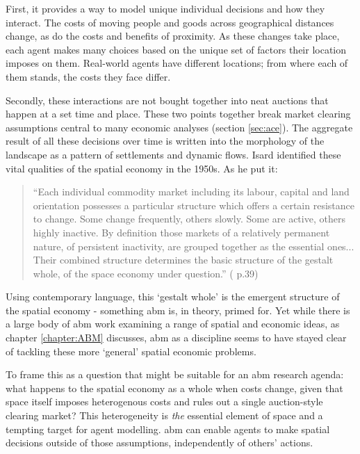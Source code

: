 First, it provides a way to model unique individual decisions and how they interact. The costs of moving people and goods across geographical distances change, as do the costs and benefits of proximity. As these changes take place, each agent makes many choices based on the unique set of factors their location imposes on them. Real-world agents have different locations; from where each of them stands, the costs they face differ. 

Secondly, these interactions are not bought together into neat auctions that happen at a set time and place. These two points together break market clearing assumptions central to many economic analyses (section \ref{sec:ace}). The aggregate result of all these decisions over time is written into the morphology of the landscape as a pattern of settlements and dynamic flows. Isard identified these vital qualities of the spatial economy in the 1950s. As he put it:

\begin{quote}
``Each individual commodity market including its labour, capital and land orientation possesses a particular structure which offers a certain resistance to change. Some change frequently, others slowly. Some are active, others highly inactive. By definition those markets of a relatively permanent nature, of persistent inactivity, are grouped together as the essential ones... Their combined structure determines the basic structure of the gestalt whole, of the space economy under question.'' (\citealt{isard_location_1956} p.39)
\end{quote}

Using contemporary language, this `gestalt whole' is the emergent structure of the spatial economy - something \gls{abm} is, in theory, primed for. Yet while there is a large body of \gls{abm} work examining a range of spatial and economic ideas, as chapter \ref{chapter:ABM} discusses, \gls{abm} as a discipline seems to have stayed clear of tackling these more `general' spatial economic problems. 

To frame this as a question that might be suitable for an \gls{abm} research agenda: what happens to the spatial economy as a whole when costs change, given that space itself imposes heterogenous costs and rules out a single auction-style clearing market? This heterogeneity is \emph{the} essential element of space and a tempting target for agent modelling. \gls{abm} can enable agents to make spatial decisions outside of those assumptions, independently of others' actions.

